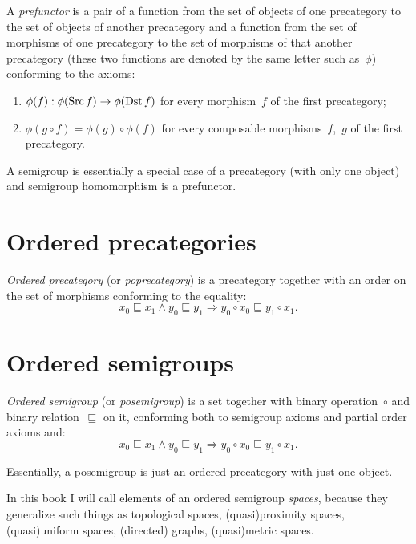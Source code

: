\begin{defn}
A \emph{prefunctor} is a pair of a function from the set of objects of one precategory to the set of objects of another precategory and a function from the set of morphisms of one precategory to the set of morphisms of that another precategory (these two functions are denoted by the same letter such as~$\phi$) conforming to the axioms:
\begin{enumerate}
\item $\phi(f): \phi(\operatorname{Src} f)\to\phi(\operatorname{Dst} f)$ for every morphism~$f$ of the first precategory;
\item $\phi(g\circ f)=\phi(g)\circ\phi(f)$ for every composable morphisms~$f$,~$g$ of the first precategory.
\end{enumerate}
\end{defn}

\begin{note}
A semigroup is essentially a special case of a precategory (with only one object) and semigroup homomorphism is a prefunctor.
\end{note}

\chapter{Ordered precategories}

\begin{defn}
\emph{Ordered precategory} (or \emph{poprecategory}) is
a precategory together with an order on the set of morphisms conforming to the equality:
\[ x_0\sqsubseteq x_1\land y_0\sqsubseteq y_1\Rightarrow y_0\circ x_0\sqsubseteq y_1\circ x_1. \]
\end{defn}

\chapter{Ordered semigroups}

\begin{defn}
\emph{Ordered semigroup} (or \emph{posemigroup}) is a set together with binary operation~$\circ$ and binary relation~$\sqsubseteq$ on it, conforming both to semigroup axioms and partial order axioms and:
\[ x_0\sqsubseteq x_1\land y_0\sqsubseteq y_1\Rightarrow y_0\circ x_0\sqsubseteq y_1\circ x_1. \]
\end{defn}

Essentially, a posemigroup is just an ordered precategory with just one object.

In this book I will call elements of an ordered semigroup \emph{spaces}, because they generalize such things as topological spaces, (quasi)proximity spaces, (quasi)uniform spaces, (directed) graphs, (quasi)metric spaces.

